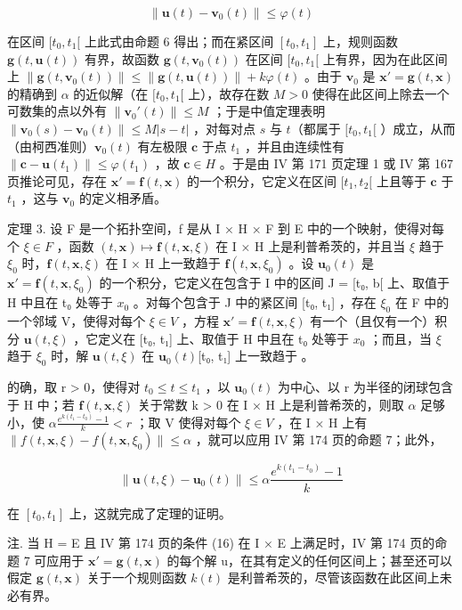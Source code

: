 \[
\left\| \mathbf {u} (t) - \mathbf {v} _ {0} (t) \right\| \leqslant \varphi (t)
\]

在区间 \([t_0, t_1[\) 上此式由命题 6 得出；而在紧区间 \([t_0, t_1]\) 上，规则函数 \(\mathbf{g}(t, \mathbf{u}(t))\) 有界，故函数 \(\mathbf{g}(t, \mathbf{v}_0(t))\) 在区间 \([t_0, t_1[\) 上有界，因为在此区间上 \(\| \mathbf{g}(t, \mathbf{v}_0(t)) \| \leqslant \| \mathbf{g}(t, \mathbf{u}(t)) \| + k\varphi(t)\) 。由于 \(\mathbf{v}_0\) 是 \(\mathbf{x}' = \mathbf{g}(t, \mathbf{x})\) 的精确到 \(\alpha\) 的近似解（在 \([t_0, t_1[\) 上），故存在数 \(M > 0\) 使得在此区间上除去一个可数集的点以外有 \(\| \mathbf{v}_0'(t) \| \leqslant M\) ；于是中值定理表明 \(\| \mathbf{v}_0(s) - \mathbf{v}_0(t) \| \leqslant M |s - t|\) ，对每对点 \(s\) 与 \(t\)（都属于 \([t_0, t_1[\) ）成立，从而（由柯西准则）\(\mathbf{v}_0(t)\) 有左极限 \(\mathbf{c}\) 于点 \(t_1\) ，并且由连续性有 \(\| \mathbf{c} - \mathbf{u}(t_1) \| \leqslant \varphi(t_1)\) ，故 \(\mathbf{c} \in H\) 。于是由 IV 第 171 页定理 1 或 IV 第 167 页推论可见，存在 \(\mathbf{x}' = \mathbf{f}(t, \mathbf{x})\) 的一个积分，它定义在区间 \([t_1, t_2[\) 上且等于 \(\mathbf{c}\) 于 \(t_1\) ，这与 \(\mathbf{v}_0\) 的定义相矛盾。

定理 3. 设 F 是一个拓扑空间，f 是从 I × H × F 到 E 中的一个映射，使得对每个 \(\xi \in F\) ，函数 \((t, \mathbf{x}) \mapsto \mathbf{f}(t, \mathbf{x}, \xi)\) 在 I × H 上是利普希茨的，并且当 \(\xi\) 趋于 \(\xi_{0}\) 时，\(\mathbf{f}(t, \mathbf{x}, \xi)\) 在 I × H 上一致趋于 \(\mathbf{f}(t, \mathbf{x}, \xi_{0})\) 。设 \(\mathbf{u}_{0}(t)\) 是 \(\mathbf{x}' = \mathbf{f}(t, \mathbf{x}, \xi_{0})\) 的一个积分，它定义在包含于 I 中的区间 J = {[}t₀, b{[} 上、取值于 H 中且在 t₀ 处等于 \(x_{0}\) 。对每个包含于 J 中的紧区间 {[}t₀, t₁{]} ，存在 \(\xi_{0}\) 在 F 中的一个邻域 V，使得对每个 \(\xi \in V\) ，方程 \(\mathbf{x}' = \mathbf{f}(t, \mathbf{x}, \xi)\) 有一个（且仅有一个）积分 \(\mathbf{u}(t, \xi)\) ，它定义在 {[}t₀, t₁{]} 上、取值于 H 中且在 t₀ 处等于 \(x_{0}\) ；而且，当 \(\xi\) 趋于 \(\xi_{0}\) 时，解 \(\mathbf{u}(t, \xi)\) 在 \(\mathbf{u}_{0}(t)\)[{t₀, t₁}]{ 上一致趋于 } 。

的确，取 r \textgreater{} 0，使得对 \(t_{0} \leqslant t \leqslant t_{1}\) ，以 \(\mathbf{u}_{0}(t)\) 为中心、以 r 为半径的闭球包含于 H 中；若 \(\mathbf{f}(t, \mathbf{x}, \xi)\) 关于常数 k \textgreater{} 0 在 I × H 上是利普希茨的，则取 \(\alpha\) 足够小，使 \(\alpha \frac{e^{k(t_{1}-t_{0})} - 1}{k} < r\) ；取 V 使得对每个 \(\xi \in V\) ，在 I × H 上有 \(\|f(t, \mathbf{x}, \xi) - f(t, \mathbf{x}, \xi_{0})\| \leqslant \alpha\) ，就可以应用 IV 第 174 页的命题 7；此外，

\[
\| \mathbf {u} (t, \xi) - \mathbf {u} _ {0} (t) \| \leqslant \alpha \frac {e ^ {k \left(t _ {1} - t _ {0}\right)} - 1}{k}
\]

在 \([t_{0}, t_{1}]\) 上，这就完成了定理的证明。

注. 当 H = E 且 IV 第 174 页的条件 (16) 在 I × E 上满足时，IV 第 174 页的命题 7 可应用于 \(\mathbf{x}' = \mathbf{g}(t, \mathbf{x})\) 的每个解 u，在其有定义的任何区间上；甚至还可以假定 \(\mathbf{g}(t,\mathbf{x})\) 关于一个规则函数 \(k(t)\) 是利普希茨的，尽管该函数在此区间上未必有界。

